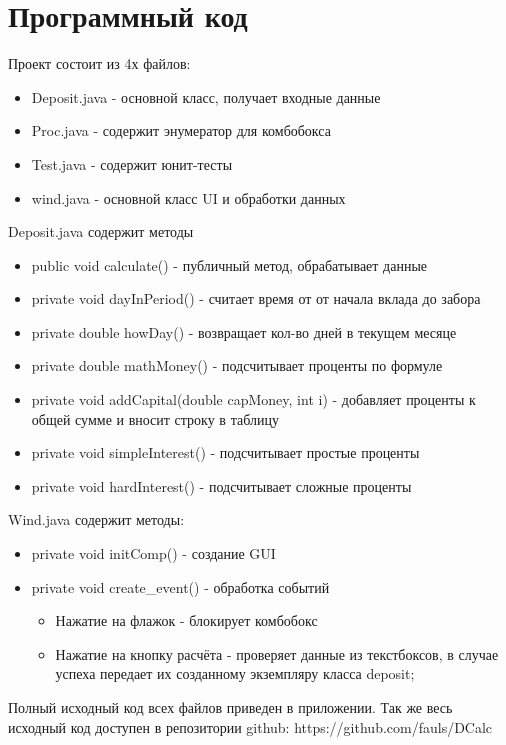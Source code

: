 \section{Программный код}
Проект состоит из 4х файлов:
\begin{itemize}
	\item Deposit.java - основной класс, получает входные данные
	\item Proc.java - содержит энумератор для комбобокса
	\item Test.java - содержит юнит-тесты
	\item wind.java - основной класс UI и обработки данных
\end{itemize}
Deposit.java содержит методы
\begin{itemize}
	\item public void calculate() - публичный метод, обрабатывает данные
	\item private void dayInPeriod() - считает время от от начала вклада до забора
	\item private double howDay() - возвращает кол-во дней в текущем месяце
	\item private double mathMoney() - подсчитывает проценты по формуле
	\item private void addCapital(double capMoney, int i) - добавляет проценты к общей сумме и вносит строку в таблицу
	\item private void simpleInterest() - подсчитывает простые проценты
	\item private void hardInterest() - подсчитывает сложные проценты
\end{itemize}
Wind.java содержит методы:
\begin{itemize}
	\item private void initComp() - создание GUI
	\item private void create\_event() - обработка событий
	\begin{itemize}
		\item Нажатие на флажок - блокирует комбобокс
		\item Нажатие на кнопку расчёта - проверяет данные из текстбоксов, в случае успеха передает их созданному экземпляру класса deposit;
	\end{itemize}
\end{itemize}
Полный исходный код всех файлов приведен в приложении.
Так же весь исходный код доступен в репозитории github:
https://github.com/fauls/DCalc

